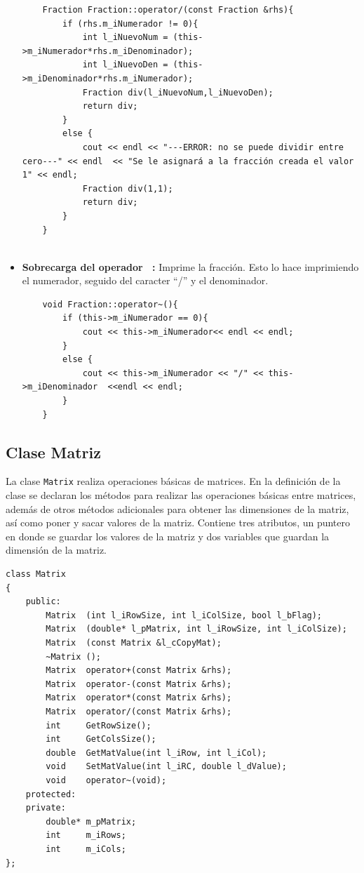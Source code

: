\begin{itemize}
\begin{verbatim}
    Fraction Fraction::operator/(const Fraction &rhs){
        if (rhs.m_iNumerador != 0){
            int l_iNuevoNum = (this->m_iNumerador*rhs.m_iDenominador);
            int l_iNuevoDen = (this->m_iDenominador*rhs.m_iNumerador);
            Fraction div(l_iNuevoNum,l_iNuevoDen);
            return div;
        }
        else {
            cout << endl << "---ERROR: no se puede dividir entre cero---" << endl  << "Se le asignará a la fracción creada el valor 1" << endl;
            Fraction div(1,1);
            return div;
        }
    }
    
    \end{verbatim}
    
    \item \textbf{Sobrecarga del operador ~: } Imprime la fracción. Esto lo hace imprimiendo el numerador, seguido del caracter ``/'' y el denominador. 
    
    \begin{verbatim}
    void Fraction::operator~(){
        if (this->m_iNumerador == 0){
            cout << this->m_iNumerador<< endl << endl;
        }
        else {
            cout << this->m_iNumerador << "/" << this->m_iDenominador  <<endl << endl;
        }
    }
    \end{verbatim}    
    
\end{itemize}

\subsection{Clase Matriz}

La clase \texttt{Matrix} realiza operaciones básicas de matrices. En la definición de la clase se declaran los métodos para realizar las operaciones básicas entre matrices, además de otros métodos adicionales para obtener las dimensiones de la matriz, así como poner y sacar valores de la matriz. Contiene tres atributos, un puntero en donde se guardar los valores de la matriz y dos variables que guardan la dimensión de la matriz.


\begin{verbatim}
class Matrix
{
	public:
		Matrix  (int l_iRowSize, int l_iColSize, bool l_bFlag);
		Matrix	(double* l_pMatrix, int l_iRowSize, int l_iColSize);
		Matrix	(const Matrix &l_cCopyMat);
		~Matrix	();
		Matrix 	operator+(const Matrix &rhs);
		Matrix 	operator-(const Matrix &rhs);
		Matrix 	operator*(const Matrix &rhs);
		Matrix 	operator/(const Matrix &rhs);
		int 	GetRowSize();
		int 	GetColsSize();
		double 	GetMatValue(int l_iRow, int l_iCol);
		void  	SetMatValue(int l_iRC, double l_dValue);
		void 	operator~(void);
	protected:
	private:
		double* m_pMatrix;
		int 	m_iRows;
		int 	m_iCols;
};
\end{verbatim}

